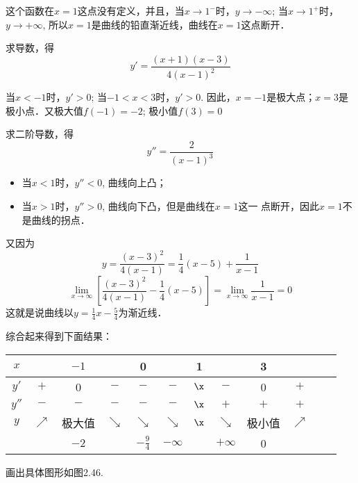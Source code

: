     \begin{solution}
        这个函数在$x=1$这点没有定义，并且，当$x\to 1^-$时，$y\to -\infty$; 当$x\to 1^+$时，$y\to +\infty$, 所以$x=1$是曲线的铅直渐近线，曲线在$x=1$这点断开．
        
    求导数，得
    \[y'= \frac{(x+1) (x-3)}{4 (x-1)^2}\]
    
    当$x<-1$时，$y'>0$; 当$-1<x<3$时，$y'>0$. 因此，$x=-1$是极大点；$x=3$是极小点．又极大值$f(-1)=-2$; 极小值$f(3)=0$
    
    求二阶导数，得
    \[y''=\frac{2}{(x-1)^3}\]
    \begin{itemize}
        \item 当$x<1$时，$y''<0$, 曲线向上凸；
        \item 当$x>1$时，$y''>0$, 曲线向下凸，但是曲线在$x=1$这一
        点断开，因此$x=1$不是曲线的拐点．
    \end{itemize}
    
    又因为
    \[y=\frac{(x-3)^2}{4(x-1)}=\frac{1}{4}(x-5)+\frac{1}{x-1}\]
    \[\lim_{x\to \infty}\left[\frac{(x-3)^2}{4(x-1)}-\frac{1}{4}(x-5)\right]=\lim_{x\to\infty}\frac{1}{x-1}=0\]
    这就是说曲线以$y=\frac{1}{4}x-\frac{5}{4}$为渐近线．
    
    综合起来得到下面结果：
    \begin{center}
        \begin{tabular}{cccccccccccc}
        \hline
        $x$ & &$-1$&&0&&1&&3&\\
        \hline
        $y'$& $+$ & 0&$-$&$-$&$-$&$\x$&$-$&0&$+$\\
        $y''$&$-$&$-$&$-$&$-$&$-$&$\x$&$+$&$+$&$+$\\
        $y$&$\nearrow$ &极大值& $\searrow$  & $\searrow$&$\searrow$ & $\x$& $\searrow$ & 极小值 & $\nearrow$  \\
        &  &$-2$&&$-\frac{9}{4}$&$-\infty $&&$+\infty$&0 &\\
        \hline
        \end{tabular}
        \end{center}
    
    画出具体图形如图2.46.
    \begin{figure}[htp]
        \centering
        \caption{}
    \end{figure}
    \end{solution}
    
